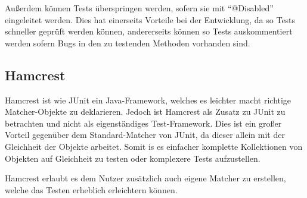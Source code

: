 Außerdem können Tests überspringen werden, sofern sie mit \enquote{@Disabled} eingeleitet werden.
Dies hat einerseits Vorteile bei der Entwicklung, da so Tests schneller geprüft werden können, andererseits können so Tests auskommentiert werden sofern Bugs in den zu testenden Methoden vorhanden sind.


\subsection{Hamcrest}

Hamcrest ist wie JUnit ein Java-Framework, welches es leichter macht richtige Matcher-Objekte zu deklarieren. Jedoch ist Hamcrest als Zusatz zu JUnit zu betrachten und nicht als eigenständiges Test-Framework.
Dies ist ein großer Vorteil gegenüber dem Standard-Matcher von JUnit, da dieser allein mit der Gleichheit der Objekte arbeitet.
Somit is es einfacher komplette Kollektionen von Objekten auf Gleichheit zu testen oder komplexere Tests aufzustellen.

Hamcrest erlaubt es dem Nutzer zusätzlich auch eigene Matcher zu erstellen, welche das Testen erheblich erleichtern können.

